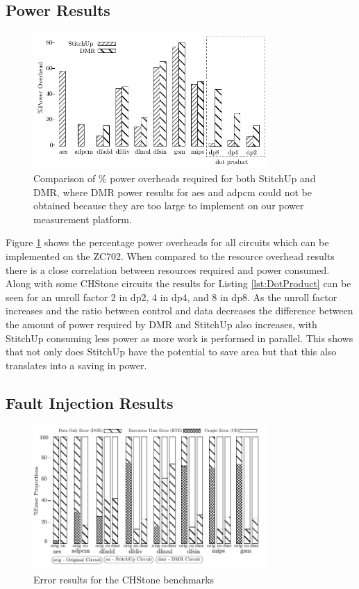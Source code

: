 \subsection{Power Results}
\begin{figure}[h]
\centering
\includegraphics[width=3.5in]{./graphs/power_results.pdf}
\caption{Comparison of \% power overheads required for both StitchUp and DMR, where DMR power results for aes and adpcm could
not be obtained because they are too large to implement on our power measurement platform.}
\label{fig:power_res}
\end{figure}

Figure \ref{fig:power_res} shows the percentage power overheads for all circuits which can be implemented on the ZC702.
When compared to the resource overhead results there is a close correlation between resources required and power consumed.
Along with some CHStone circuits the results for Listing \ref{lst:DotProduct} can be seen for an unroll factor 2 in dp2, 4 in dp4,
and 8 in dp8.
As the unroll factor increases and the ratio between control and data decreases the difference between the amount of power required by DMR and StitchUp also
increases, with StitchUp consuming less power as more work is performed in parallel.
This shows that not only does StitchUp have the potential to save area but that this also translates into a
saving in power.

\subsection{Fault Injection Results}

\begin{figure}[t]
\centering
\includegraphics[width=3.5in]{./graphs/errors_res.pdf}
\caption{Error results for the CHStone benchmarks}
\label{fig:error_res}
\end{figure}

